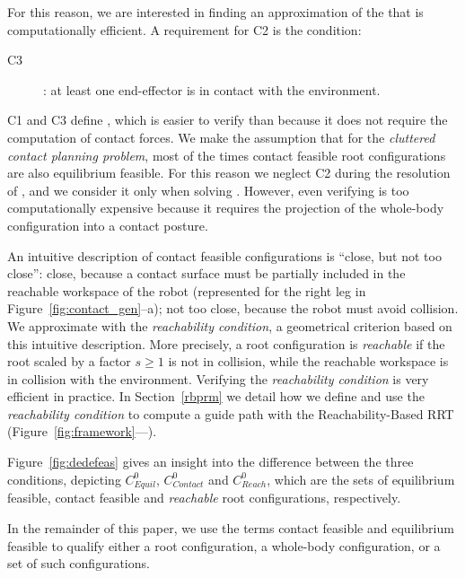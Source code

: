 For this reason, we are interested in finding an approximation of the  that is computationally efficient.
A requirement for C2 is the condition:
\begin{description}
\item[C3]: at least one end-effector is in contact with the environment.
\end{description}
C1 and C3 define , which is easier to verify than  because it does not require the computation of contact forces.
We make the assumption that for the \textit{\gls{cluttered} contact planning problem}, most of the times \gls{contact feasible} root configurations are also \gls{equilibrium feasible}.
For this reason we neglect C2 during the resolution of \Pa, and we consider it only when solving \Pb.
However, even verifying  is too computationally expensive because it requires the projection of the whole-body configuration into a contact posture.

An intuitive description of \gls{contact feasible} configurations is ``close, but not too close'': close, because a contact surface must be partially included in the reachable workspace of the robot (represented for the right leg in Figure~\ref{fig:contact_gen}--a); not too close, because the robot must avoid collision.
We approximate  with the \textit{reachability condition}, a geometrical criterion based on this intuitive description.
More precisely, a root configuration is \textit{reachable} if the root scaled by a factor $s \geq 1$ is not in collision, while the reachable workspace is in collision with the environment.
Verifying the \textit{reachability condition} is very efficient in practice.
In Section~\ref{rbprm} we detail how  we define and use the \textit{reachability condition} to compute a guide path with the Reachability-Based RRT (Figure~\ref{fig:framework}---\Pa).

Figure~\ref{fig:dedefeas} gives an insight into the difference between the three conditions, depicting $C_{Equil}^0$, $C_{Contact}^0$ and $C_{Reach}^0$, which are the sets of \gls{equilibrium feasible}, \gls{contact feasible} and \textit{reachable} root configurations, respectively.

In the remainder of this paper, we use the terms \gls{contact feasible} and \gls{equilibrium feasible} to qualify either a root configuration, a whole-body configuration, or a set
of such configurations.


